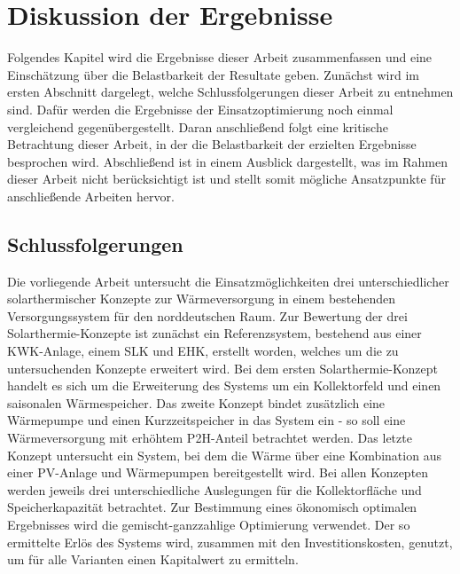 \chapter{Diskussion der Ergebnisse}\label{chapter: Diskussion der Ergebnisse}
\thispagestyle{empty}
Folgendes Kapitel wird die Ergebnisse dieser Arbeit zusammenfassen und eine Einschätzung über die Belastbarkeit der Resultate geben. Zunächst wird im ersten Abschnitt dargelegt, welche Schlussfolgerungen dieser Arbeit zu entnehmen sind. Dafür werden die Ergebnisse der Einsatzoptimierung noch einmal vergleichend gegenübergestellt. Daran anschließend folgt eine kritische Betrachtung dieser Arbeit, in der die Belastbarkeit der erzielten Ergebnisse besprochen wird. Abschließend ist in einem Ausblick dargestellt, was im Rahmen dieser Arbeit nicht berücksichtigt ist und stellt somit mögliche Ansatzpunkte für anschließende Arbeiten hervor.

\section{Schlussfolgerungen}\label{section: Schlussfolgerungen}
Die vorliegende Arbeit untersucht die Einsatzmöglichkeiten drei unterschiedlicher solarthermischer Konzepte zur Wärmeversorgung in einem bestehenden Versorgungssystem für den norddeutschen Raum. Zur Bewertung der drei Solarthermie-Konzepte ist zunächst ein Referenzsystem, bestehend aus einer \ac{KWK}-Anlage, einem \acl{SLK} und \acl{EHK}, erstellt worden, welches um die zu untersuchenden Konzepte erweitert wird. Bei dem ersten Solarthermie-Konzept handelt es sich um die Erweiterung des Systems um ein Kollektorfeld und einen saisonalen Wärmespeicher. Das zweite Konzept bindet zusätzlich eine Wärmepumpe und einen Kurzzeitspeicher in das System ein - so soll eine Wärmeversorgung mit erhöhtem \ac{P2H}-Anteil betrachtet werden. Das letzte Konzept untersucht ein System, bei dem die Wärme über eine Kombination aus einer \ac{PV}-Anlage und Wärmepumpen bereitgestellt wird. Bei allen Konzepten werden jeweils drei unterschiedliche Auslegungen für die Kollektorfläche und Speicherkapazität betrachtet. Zur Bestimmung eines ökonomisch optimalen Ergebnisses wird die gemischt-ganzzahlige Optimierung verwendet. Der so ermittelte Erlös des Systems wird, zusammen mit den Investitionskosten, genutzt, um für alle Varianten einen Kapitalwert zu ermitteln.

